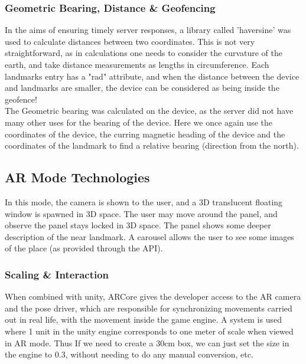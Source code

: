 \subsubsection{Geometric Bearing, Distance \& Geofencing}
In the aims of ensuring timely server responses, a library called 'haversine' was used to calculate distances between two coordinates. This is not very straightforward, 
as in calculations one needs to consider the curvature of the earth, and take distance measurements as lengths in circumference. Each landmarks entry has a "rad" 
attribute, and when the distance between the device and landmarks are smaller, the device can be considered as being inside the geofence!\\
The Geometric bearing was calculated on the device, as the server did not have many other uses for the bearing of the device. Here we once again use the coordinates 
of the device, the curring magnetic heading of the device and the coordinates of the landmark to find a relative bearing (direction from the north).   




\subsection{AR Mode Technologies}
In this mode, the camera is shown to the user, and a 3D translucent floating window is spawned in 3D space.
The user may move around the panel, and observe the panel stays locked in 3D space. The panel shows
some deeper description of the near landmark. A carousel allows the user to see some images of the place
 (as provided through the API). 


\subsubsection{Scaling \& Interaction}
When combined with unity, ARCore gives the developer access to the AR camera and the pose driver, which are responsible for synchronizing movements 
carried out in real life, with the movement inside the game engine. A system is used where 1 unit in the unity engine corresponds to one meter of scale when 
viewed in AR mode. Thus If we need to create a 30cm box, we can just set the size in the engine to 0.3, without needing to do any manual conversion, etc.

